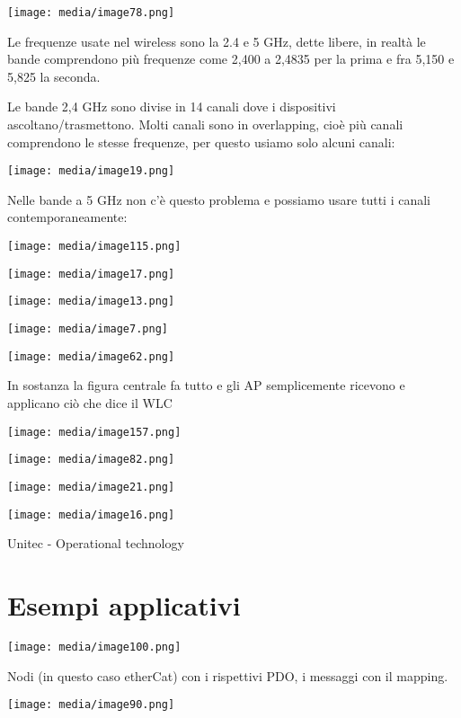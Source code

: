 \texttt{[image: media/image78.png]}

Le frequenze usate nel wireless sono la 2.4 e 5 GHz, dette libere, in
realtà le bande comprendono più frequenze come 2,400 a 2,4835 per la
prima e fra 5,150 e 5,825 la seconda.

Le bande 2,4 GHz sono divise in 14 canali dove i dispositivi
ascoltano/trasmettono. Molti canali sono in overlapping, cioè più canali
comprendono le stesse frequenze, per questo usiamo solo alcuni canali:

\texttt{[image: media/image19.png]}

Nelle bande a 5 GHz non c'è questo problema e possiamo usare tutti i
canali contemporaneamente:

\texttt{[image: media/image115.png]}

\texttt{[image: media/image17.png]}

\texttt{[image: media/image13.png]}

\texttt{[image: media/image7.png]}

\texttt{[image: media/image62.png]}

In sostanza la figura centrale fa tutto e gli AP semplicemente ricevono
e applicano ciò che dice il WLC

\texttt{[image: media/image157.png]}

\texttt{[image: media/image82.png]}

\texttt{[image: media/image21.png]}

\texttt{[image: media/image16.png]}

Unitec - Operational technology

\section{Esempi applicativi}\label{esempi-applicativi}

\texttt{[image: media/image100.png]}

Nodi (in questo caso etherCat) con i rispettivi PDO, i messaggi con il
mapping.

\texttt{[image: media/image90.png]}

